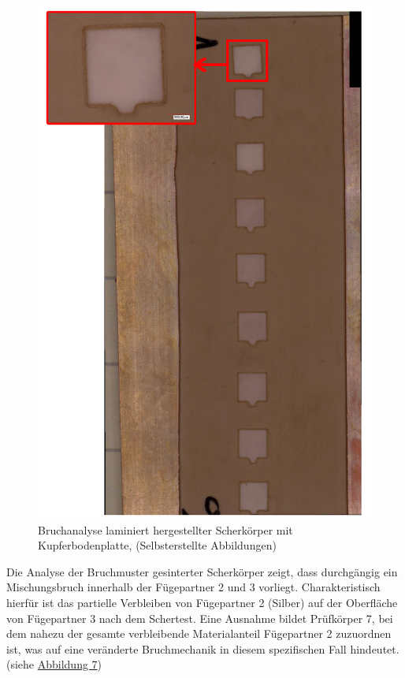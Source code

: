 \begin{figure}[H]
    \centering
    \includegraphics[scale=0.2]{Bilder/WhatsApp Image 2025-03-28 at 21.29.51.jpeg}
    \caption{Bruchanalyse laminiert hergestellter Scherkörper mit Kupferbodenplatte, (Selbsterstellte Abbildungen)}
    \label{lamWhats}
\end{figure}

Die Analyse der Bruchmuster gesinterter Scherkörper zeigt, dass durchgängig ein Mischungsbruch innerhalb der Fügepartner 2 und 3 vorliegt. Charakteristisch hierfür ist das partielle Verbleiben von Fügepartner 2 (Silber) auf der Oberfläche von Fügepartner 3 nach dem Schertest. Eine Ausnahme bildet Prüfkörper 7, bei dem nahezu der gesamte verbleibende Materialanteil Fügepartner 2 zuzuordnen ist, was auf eine veränderte Bruchmechanik in diesem spezifischen Fall hindeutet. (siehe \hyperref[sin]{Abbildung 7})


